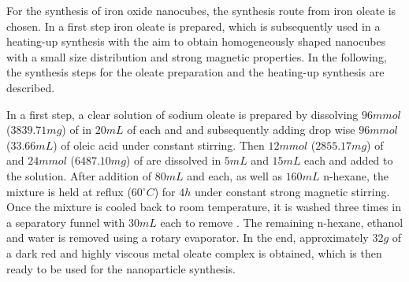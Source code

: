 \documentclass[\main/dresen_thesis.tex]{subfiles}
\begin{document}
  \label{sec:colloidalCrystals:nanoparticle:synthesisOleatesAcAc}
  For the synthesis of iron oxide nanocubes, the synthesis route from iron oleate is chosen.
  In a first step iron oleate is prepared, which is subsequently used in a heating-up synthesis with the aim to obtain homogeneously shaped nanocubes with a small size distribution and strong magnetic properties.
  In the following, the synthesis steps for the oleate preparation and the heating-up synthesis are described.
  
    In a first step, a clear solution of sodium oleate is prepared by dissolving $96 \unit{mmol}$ ($3839.71 \unit{mg}$) of  in $20 \unit{mL}$ of each  and  and subsequently adding drop wise $96 \unit{mmol}$ ($33.66 \unit{mL}$) of oleic acid under constant stirring.
    Then $12 \unit{mmol}$ ($2855.17 \unit{mg}$) of  and $24 \unit{mmol}$ ($6487.10 \unit{mg}$) of  are dissolved in $5 \unit{mL}$  and $15 \unit{mL}$  each and added to the solution.
    After addition of $80 \unit{mL}$  and  each, as well as $160 \unit{mL}$ n-hexane, the mixture is held at reflux ($60 \unit{^\circ C}$) for $4 \unit{h}$ under constant strong magnetic stirring.
    Once the mixture is cooled back to room temperature, it is washed three times in a separatory funnel with $30 \unit{mL}$  each to remove .
    The remaining n-hexane, ethanol and water is removed using a rotary evaporator.
    In the end, approximately $32 \unit{g}$ of a dark red and highly viscous metal oleate complex is obtained, which is then ready to be used for the nanoparticle synthesis.
\end{document}
